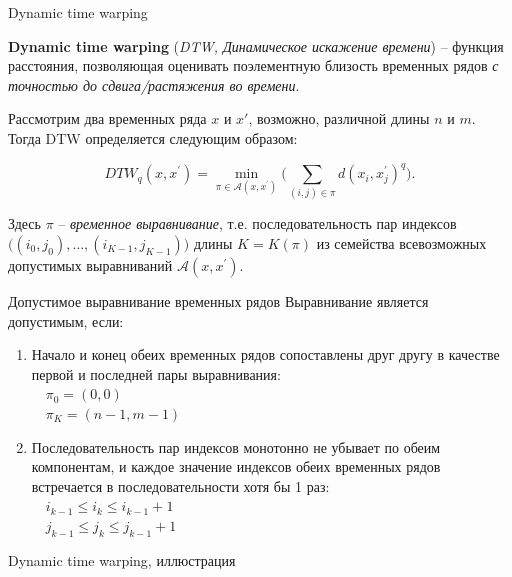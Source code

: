 \begin{frame}{Dynamic time warping}

\textbf{Dynamic time warping} (\textit{DTW, Динамическое искажение времени}) -- функция расстояния, позволяющая оценивать поэлементную близость временных рядов \textit{с точностью до сдвига/растяжения во времени}.\\
\vspace{0.2cm}

Рассмотрим два временных ряда $x$ и $x'$, возможно, различной длины $n$ и $m$. Тогда DTW определяется следующим образом:

$$ DTW_q( x, x^{'}) = \min_{\pi \in \mathcal{A}(x, x^{'})}\Bigg( \sum_{(i,j) \in \pi} d(x_i, x_j^{'})^q \Bigg).$$

Здесь $\pi$ -- \textit{временное выравнивание}, т.е. последовательность пар индексов $\big( (i_0, j_0), \dots, (i_{K-1}, j_{K-1})  \big)$ длины $K = K(\pi)$ из семейства всевозможных допустимых выравниваний $\mathcal{A}(x, x^{'})$. 

\end{frame}

\begin{frame}{Допустимое выравнивание временных рядов}
    Выравнивание является допустимым, если:
\begin{enumerate}
    \item Начало и конец обеих временных рядов сопоставлены друг другу в качестве первой и последней пары выравнивания:\\
    \vspace{0.2cm}
    $\quad \displaystyle \pi_0 = (0, 0)$\\
    $\quad \displaystyle \pi_K = (n-1, m-1)$


    \item Последовательность пар индексов монотонно не убывает по обеим компонентам, и каждое значение индексов обеих временных рядов встречается в последовательности хотя бы 1 раз:\\
    \vspace{0.2cm}
    $\quad \displaystyle i_{k-1} \leq i_k \leq i_{k-1} + 1$\\
    $\quad \displaystyle j_{k-1} \leq j_k \leq j_{k-1} + 1$

\end{enumerate}
\end{frame}

\begin{frame}{Dynamic time warping, иллюстрация}
\begin{figure}
    \centering
\end{figure}

\end{frame}

